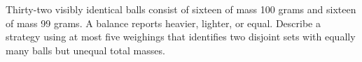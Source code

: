 Thirty-two visibly identical balls consist of sixteen of mass 100 grams and sixteen of mass 99 grams. A balance reports heavier, lighter, or equal. Describe a strategy using at most five weighings that identifies two disjoint sets with equally many balls but unequal total masses.
